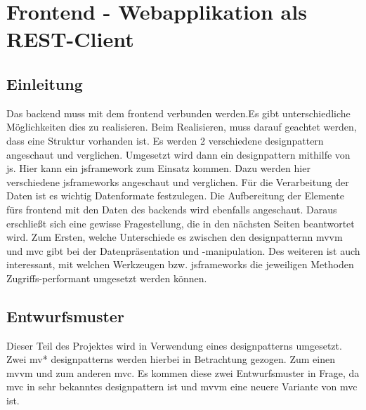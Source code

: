 \section{Frontend - Webapplikation als REST-Client}
\subsection{Einleitung}
Das \Gls{backend} muss mit dem \Gls{frontend} verbunden werden.Es gibt unterschiedliche Möglichkeiten dies zu realisieren. Beim Realisieren, muss darauf geachtet werden, dass eine Struktur vorhanden ist. Es werden 2 verschiedene \Gls{designpattern} angeschaut und verglichen. Umgesetzt wird dann ein \Gls{designpattern} mithilfe von \Gls{js}. Hier kann ein \Gls{jsframework} zum Einsatz kommen. Dazu werden hier verschiedene \Gls{jsframework}s angeschaut und verglichen. Für die Verarbeitung der Daten ist es wichtig Datenformate festzulegen. Die Aufbereitung der Elemente fürs \Gls{frontend} mit den Daten des \Gls{backend}s wird ebenfalls angeschaut.
\newline
\newline
Daraus erschließt sich eine gewisse Fragestellung, die in den nächsten Seiten beantwortet wird. Zum Ersten, welche Unterschiede es zwischen den \Gls{designpattern}n \Gls{mvvm} und \Gls{mvc} gibt bei der Datenpräsentation und -manipulation. Des weiteren ist auch interessant, mit welchen Werkzeugen bzw. \Gls{jsframework}s die jeweiligen Methoden Zugriffs-performant umgesetzt werden können.
\subsection{Entwurfsmuster}
Dieser Teil des Projektes wird in Verwendung eines \Gls{designpattern}s umgesetzt. Zwei \Gls{mv*} \Gls{designpattern}s werden hierbei in Betrachtung gezogen. Zum einen \Gls{mvvm} und zum anderen \Gls{mvc}. Es kommen diese zwei Entwurfsmuster in Frage, da \Gls{mvc} in sehr bekanntes \Gls{designpattern} ist und \Gls{mvvm} eine neuere Variante von \Gls{mvc} ist.
